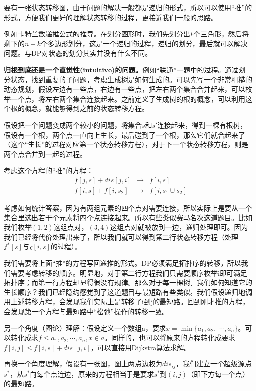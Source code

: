 要有一张状态转移图，由于问题的解决一般都是递归的形式，所以可以使用“推”的形式，方便我们更好的理解状态转移的过程，更接近我们一般的思路。

例如卡特兰数递推公式的推导。在划分图形时，我们先划分出$k$个三角形，然后将剩下的$n-k$个多边形划分，这是一个递归的过程，递归的划分，最后就可以解决问题。与DP对状态的划分其实并没有什么不同。

\textbf{归根到底还是一个直觉性(intuitive)的问题。}例如“联通”一题中的过程。通过划分状态，找到重复的子问题，考虑生成树是如何生成的。可以先写一个非常粗糙的动态规划，假设左边有一些点，右边有一些点，把左右两个集合合并起来，可以枚举一个点，将左右两个集合连接起来。之前定义了生成树的根的概念，可以利用这个根的概念，就能够得到之前的状态转移方程。

假设把一个问题变成两个较小的问题，将集合$s$和$s'$连接起来，得到一棵有根树，假设有一个根，两个点一直向上生长，最后碰到了一个根，那么它们就合起来了（这个“生长”的过程对应第一个状态转移方程），对于下一个状态转移方程，则是两个点合并到一起的过程。

考虑这个方程的“推”的方程：
\begin{equation*}
    \begin{aligned}
        &f[j,s]+dis[j,i]&\to& f[i,s]\\
        &f[i,s]+f[i,s_2]&\to& f[i,s_1\cup s_2]
    \end{aligned}
\end{equation*}

考虑如何统计答案，因为有两组元素的四个点对需要连接，所以实际上是要从一个集合里选出若干个元素将四个点连接起来。所以有些类似赛马名次这道题目。比如我们枚举$(1,2)$这组点对，$(3,4)$这组点对就被放到一边，递归处理即可。因为我们已经将代价处理出来了，所以我们就可以得到第二行状态转移方程（处理$f^*[s]$与$g[i,s]$的过程）。

我们需要将上面“推”的方程写回递推的形式。DP必须满足拓扑序的转移，所以我们需要考虑转移的顺序。明显地，对于第二行方程我们只需要顺序枚举i即可满足拓扑序；而第一行方程却显得很没有规律。那么对于每一棵树，我们如何知道它的生长顺序？我们已经隐约感觉到了这道题目与最短路有些类似。我们假设递归地调用上述转移方程，会发现我们实际上是转移了i到j的最短路。回到刚才推的方程，会发现第一个方程与最短路中“松弛”操作的转移一致。

另一个角度（图论）理解：假设定义一个数组a，要求$x=\min\{a_1,a_2,$ $\cdots,a_n\}$。可以转化成求$f\le a_1,a_2,\cdots,a_n,x\in a$。同样的，也可以将原来的方程转化成要求$f[i,j]\le f[i,s]+dis[j,i]$，可以直接用Dijkstra算法求解。

再换一个角度理解，假设有一张图，图上两点边权为$dis_{ij}$，我们建立一个超级源点$s^*$，从$s^*$向每个点连边，原来的方程相当于是要求$s^*$到$(i,j)$（即下方每一个点）的最短路。

